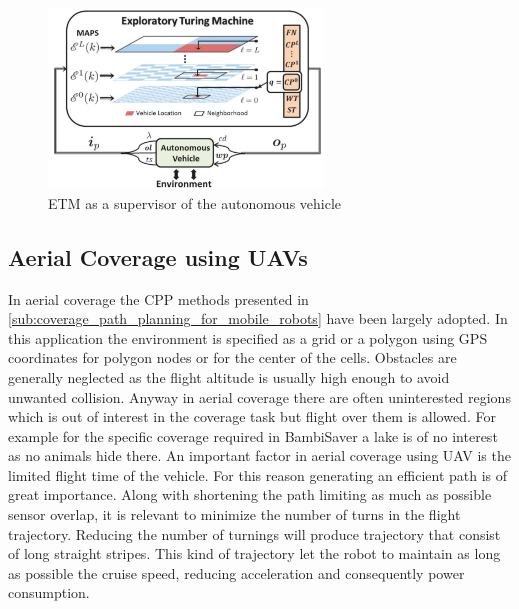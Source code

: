 \begin{figure}[ht]
    \centering
    \includegraphics[width=0.65\textwidth]{figures/C3/ETM-online-CPP.png}
    \caption{ETM as a supervisor of the autonomous vehicle \cite{8286947}}
    \label{fig:ETM-online-CPP}
\end{figure}


\subsection{Aerial Coverage using UAVs} %
\label{sub:aerial_coverage_using_uavs}
In aerial coverage the CPP methods presented in \autoref{sub:coverage_path_planning_for_mobile_robots} have been largely adopted. In this application the environment is specified as a grid or a polygon using GPS coordinates for polygon nodes or for the center of the cells. Obstacles are generally neglected as the flight altitude is usually high enough to avoid unwanted collision. Anyway in aerial coverage there are often uninterested regions which is out of interest in the coverage task but flight over them is allowed. For example for the specific coverage required in BambiSaver a lake is of no interest as no animals hide there. An important factor in aerial coverage using UAV is the limited flight time of the vehicle. For this reason generating an efficient path is of great importance. Along with shortening the path limiting as much as possible sensor overlap, it is relevant to minimize the number of turns in the flight trajectory. Reducing the number of turnings will produce trajectory that consist of long straight stripes. This kind of trajectory let the robot to maintain as long as possible the cruise speed, reducing acceleration and consequently power consumption.

